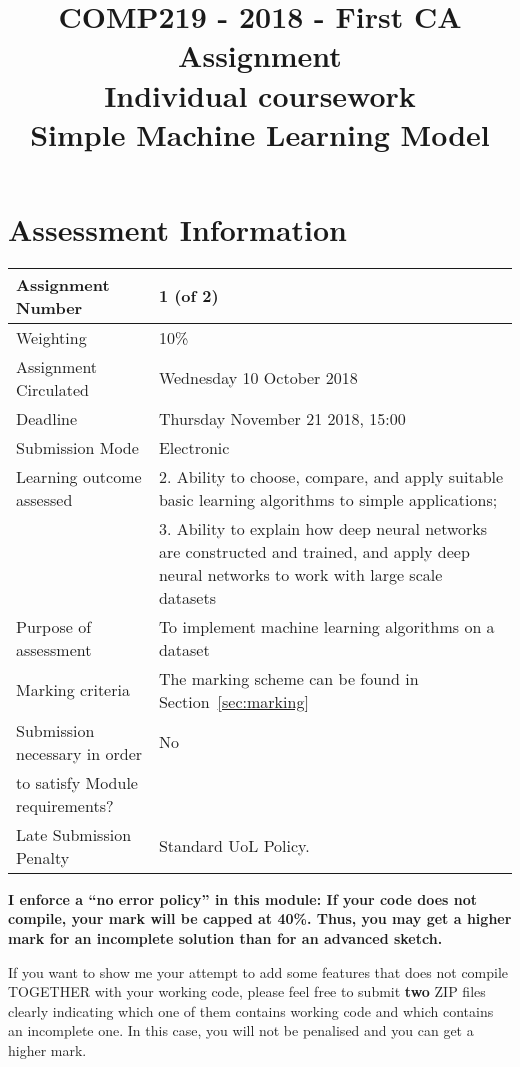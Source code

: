 \documentclass[12pt,a4]{article}
\title{COMP219 - 2018 - First CA Assignment\\
Individual coursework\\
Simple Machine Learning Model}
\date{}
\author{}
\begin{document}
\maketitle

\section*{Assessment Information}
\begin{table}[htb]
\begin{tabular}{|l|p{}|}\hline
Assignment Number               & 1 (of 2)\\ \hline
Weighting                       & 10\%\\ \hline
Assignment Circulated           & Wednesday 10 October 2018\\ \hline
Deadline                        & Thursday November 21 2018,  15:00\\ \hline
Submission Mode                 & Electronic\\ \hline
Learning outcome assessed       & 2.	Ability to choose, compare, and apply suitable basic learning algorithms to simple applications; \\
                                & 3. Ability to explain how deep neural networks are constructed and trained, and apply deep neural networks to work with large scale datasets \\ \hline
Purpose of assessment           & To implement machine learning algorithms on  a dataset \\ \hline
Marking criteria                & The marking scheme can be found in Section~\ref{sec:marking}\\ \hline
Submission necessary in order   &  No\\
to satisfy Module requirements? & \\ \hline
Late Submission Penalty         & Standard UoL Policy.\\ \hline
\end{tabular}
\end{table}


{\textbf{I enforce a ``no error policy'' in this module: If your code does not 
compile, your mark will be capped at 40\%. Thus, you may get a higher mark
for an incomplete solution than for an advanced sketch.}}

\medskip 

If you want to show me your attempt to add some features that does not compile 
TOGETHER with your working code, please feel free to submit \textbf{two} ZIP files
clearly indicating which one of them contains working code and which contains
an incomplete one. In this case, you will not be penalised and you can 
get a higher mark. 
\end{document}
